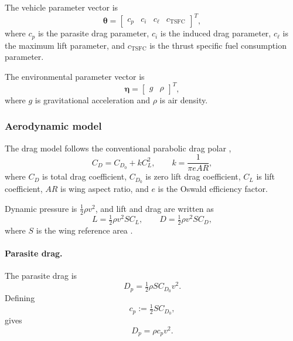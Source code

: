 \documentclass[11pt,a4paper]{article}
\newcommand{\vectheta}{\bm{\theta}}
\newcommand{\veceta}{\bm{\eta}}
\begin{document}
The vehicle parameter vector is
\begin{equation}
  \vectheta = \begin{bmatrix} c_p & c_i & c_\ell & c_{\mathrm{TSFC}} \end{bmatrix}^{T},
  \label{eq:theta}
\end{equation}
where $c_p$ is the parasite drag parameter, $c_i$ is the induced drag parameter,
$c_\ell$ is the maximum lift parameter, and $c_{\mathrm{TSFC}}$ is the thrust
specific fuel consumption parameter.

The environmental parameter vector is
\begin{equation}
  \veceta = \begin{bmatrix} g & \rho \end{bmatrix}^{T},
\end{equation}
where $g$ is gravitational acceleration and $\rho$ is air density.

\subsubsection{Aerodynamic model}

The drag model follows the conventional parabolic drag polar
\cite{nasa-drag,nasa-induced},
\begin{equation}
  C_D = C_{D_0} + k C_L^2, \qquad k = \frac{1}{\pi e A\!R},
\end{equation}
where $C_D$ is total drag coefficient, $C_{D_0}$ is zero lift drag coefficient,
$C_L$ is lift coefficient, $A\!R$ is wing aspect ratio, and $e$ is the Oswald
efficiency factor.

Dynamic pressure is $\tfrac{1}{2}\rho v^2$, and lift and drag are written as
\begin{equation}
  L = \tfrac{1}{2}\rho v^{2} S C_L, \qquad
  D = \tfrac{1}{2}\rho v^{2} S C_D,
  \label{eq:lift-drag}
\end{equation}
where $S$ is the wing reference area \cite{nasa-lift}.

\paragraph{Parasite drag.}
The parasite drag is
\begin{equation}
  D_p = \tfrac{1}{2}\rho S C_{D_0} v^{2} .
\end{equation}
Defining
\begin{equation}
  c_p := \tfrac{1}{2} S C_{D_0},
  \label{eq:cp}
\end{equation}
gives
\begin{equation}
  D_p = \rho c_p v^{2} .
\end{equation}
\end{document}
